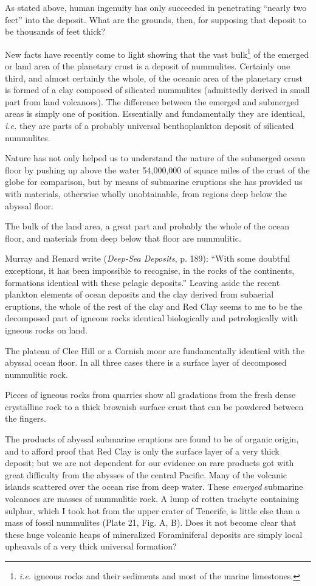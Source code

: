 \documentclass[a4paper, 12pt, oneside]{article}
\begin{document}
As stated above, human ingenuity has only succeeded in penetrating ``nearly two feet'' into the deposit. What are the grounds, then, for supposing that deposit to be thousands of feet thick?

New facts have recently come to light showing that the vast bulk\footnote{\emph{i.e.} igneous rocks and their sediments and most of the marine limestones.} of the emerged or land area of the planetary crust is a deposit of nummulites. Certainly one third, and almost certainly the whole, of the oceanic area of the planetary crust is formed of a clay composed of silicated nummulites (admittedly derived in small part from land volcanoes). The difference between the emerged and submerged areas is simply one of position. Essentially and fundamentally they are identical, \emph{i.e.} they are parts of a probably universal benthoplankton deposit of silicated nummulites.

Nature has not only helped us to understand the nature of the submerged ocean floor by pushing up above the water 54,000,000 of square miles of the crust of the globe for comparison, but by means of submarine eruptions she has provided us with materials, otherwise wholly unobtainable, from regions deep below the abyssal floor.

The bulk of the land area, a great part and probably the whole of the ocean floor, and materials from deep below that floor are nummulitic.

Murray and Renard write (\emph{Deep-Sea Deposits}, p. 189): ``With some doubtful exceptions, it has been impossible to recognise, in the rocks of the continents, formations identical with these pelagic deposits.'' Leaving aside the recent plankton elements of ocean deposits and the clay derived from subaerial eruptions, the whole of the rest of the clay and Red Clay seems to me to be the decomposed part of igneous rocks identical biologically and petrologically with igneous rocks on land.

The plateau of Clee Hill or a Cornish moor are fundamentally identical with the abyssal ocean floor. In all three cases there is a surface layer of decomposed nummulitic rock.

Pieces of igneous rocks from quarries show all gradations from the fresh dense crystalline rock to a thick brownish surface crust that can be powdered between the fingers.

The products of abyssal submarine eruptions are found to be of organic origin, and to afford proof that Red Clay is only the surface layer of a very thick deposit; but we are not dependent for our evidence on rare products got with great difficulty from the abysses of the central Pacific. Many of the volcanic islands scattered over the ocean rise from deep water. These \emph{emerged} submarine volcanoes are masses of nummulitic rock. A lump of rotten trachyte containing sulphur, which I took hot from the upper crater of Tenerife, is little else than a mass of fossil nummulites (Plate 21, Fig. A, B). Does it not become clear that these huge volcanic heaps of mineralized Foraminiferal deposits are simply local upheavals of a very thick universal formation?
\end{document}
